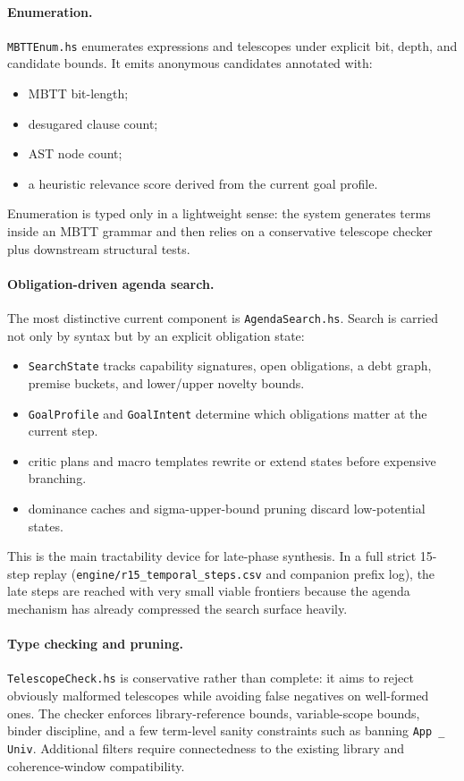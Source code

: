 \documentclass[11pt,a4paper]{article}
\begin{document}
\paragraph{Enumeration.}
\texttt{MBTTEnum.hs} enumerates expressions and telescopes under explicit bit, depth, and candidate bounds. It emits anonymous candidates annotated with:
\begin{itemize}[nosep]
  \item MBTT bit-length;
  \item desugared clause count;
  \item AST node count;
  \item a heuristic relevance score derived from the current goal profile.
\end{itemize}
Enumeration is typed only in a lightweight sense: the system generates terms inside an MBTT grammar and then relies on a conservative telescope checker plus downstream structural tests.

\paragraph{Obligation-driven agenda search.}
The most distinctive current component is \texttt{AgendaSearch.hs}. Search is carried not only by syntax but by an explicit obligation state:
\begin{itemize}[nosep]
  \item \texttt{SearchState} tracks capability signatures, open obligations, a debt graph, premise buckets, and lower/upper novelty bounds.
  \item \texttt{GoalProfile} and \texttt{GoalIntent} determine which obligations matter at the current step.
  \item critic plans and macro templates rewrite or extend states before expensive branching.
  \item dominance caches and sigma-upper-bound pruning discard low-potential states.
\end{itemize}
This is the main tractability device for late-phase synthesis. In a full strict 15-step replay (\texttt{engine/r15\_temporal\_steps.csv} and companion prefix log), the late steps are reached with very small viable frontiers because the agenda mechanism has already compressed the search surface heavily.

\paragraph{Type checking and pruning.}
\texttt{TelescopeCheck.hs} is conservative rather than complete: it aims to reject obviously malformed telescopes while avoiding false negatives on well-formed ones. The checker enforces library-reference bounds, variable-scope bounds, binder discipline, and a few term-level sanity constraints such as banning \texttt{App \_ Univ}. Additional filters require connectedness to the existing library and coherence-window compatibility.
\end{document}

